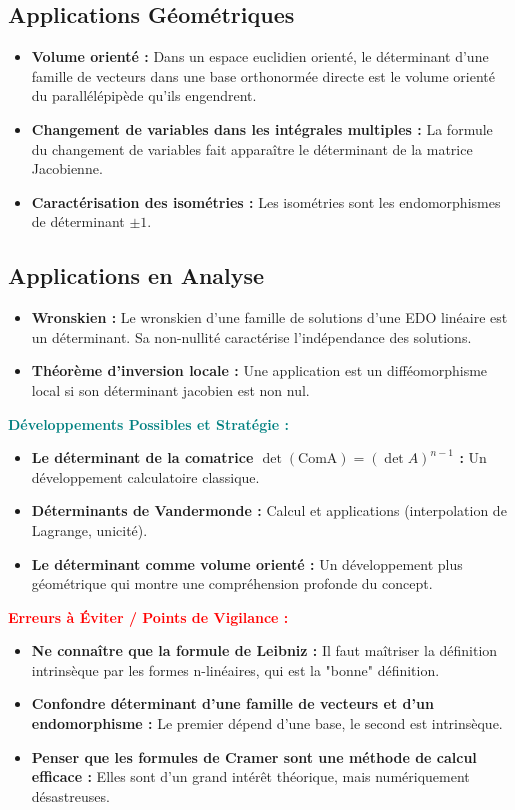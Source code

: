 \documentclass[12pt, a4paper, parskip=full]{report}
\theoremstyle{agregstyle}
\newenvironment{developpements}
  {\par\medskip\noindent\begin{oframed}\noindent\textbf{\textcolor{teal}{Développements Possibles et Stratégie :}}}
  {\end{oframed}\par\medskip}
\newenvironment{erreurs}
  {\par\medskip\noindent\begin{oframed}\noindent\textbf{\textcolor{red}{Erreurs à Éviter / Points de Vigilance :}}}
  {\end{oframed}\par\medskip}
\begin{document}
\subsection{Applications Géométriques}
\begin{itemize}
    \item \textbf{Volume orienté :} Dans un espace euclidien orienté, le déterminant d'une famille de vecteurs dans une base orthonormée directe est le volume orienté du parallélépipède qu'ils engendrent.
    \item \textbf{Changement de variables dans les intégrales multiples :} La formule du changement de variables fait apparaître le déterminant de la matrice Jacobienne.
    \item \textbf{Caractérisation des isométries :} Les isométries sont les endomorphismes de déterminant $\pm 1$.
\end{itemize}
\subsection{Applications en Analyse}
\begin{itemize}
    \item \textbf{Wronskien :} Le wronskien d'une famille de solutions d'une EDO linéaire est un déterminant. Sa non-nullité caractérise l'indépendance des solutions.
    \item \textbf{Théorème d'inversion locale :} Une application est un difféomorphisme local si son déterminant jacobien est non nul.
\end{itemize}

\begin{developpements}
    \begin{itemize}
        \item \textbf{Le déterminant de la comatrice $\det(\mathrm{Com A}) = (\det A)^{n-1}$ :} Un développement calculatoire classique.
        \item \textbf{Déterminants de Vandermonde :} Calcul et applications (interpolation de Lagrange, unicité).
        \item \textbf{Le déterminant comme volume orienté :} Un développement plus géométrique qui montre une compréhension profonde du concept.
    \end{itemize}
\end{developpements}

\begin{erreurs}
    \begin{itemize}
        \item \textbf{Ne connaître que la formule de Leibniz :} Il faut maîtriser la définition intrinsèque par les formes n-linéaires, qui est la "bonne" définition.
        \item \textbf{Confondre déterminant d'une famille de vecteurs et d'un endomorphisme :} Le premier dépend d'une base, le second est intrinsèque.
        \item \textbf{Penser que les formules de Cramer sont une méthode de calcul efficace :} Elles sont d'un grand intérêt théorique, mais numériquement désastreuses.
    \end{itemize}
\end{erreurs}
\end{document}

